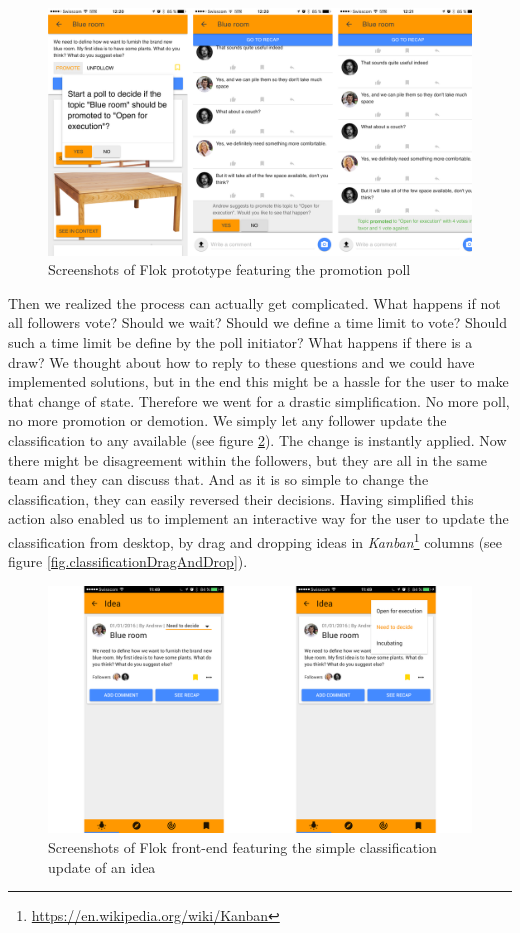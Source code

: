 \documentclass[a4paper,12pt, oneside]{article}
\begin{document}
\begin{figure}[!htb]
\centering
\includegraphics[width=\textwidth]{images/promotionPoll.png}
\caption{Screenshots of Flok prototype featuring the promotion poll}
\label{fig.promotionPoll}
\end{figure}

Then we realized the process can actually get complicated.
What happens if not all followers vote?
Should we wait?
Should we define a time limit to vote? Should such a time limit be define by the poll initiator?
What happens if there is a draw?
We thought about how to reply to these questions and we could have implemented solutions, but in the end this might be a hassle for the user to make that change of state.
Therefore we went for a drastic simplification.
No more poll, no more promotion or demotion.
We simply let any follower update the classification to any available (see figure \ref{fig.classificationSelect}).
The change is instantly applied.
Now there might be disagreement within the followers, but they are all in the same team and they can discuss that.
And as it is so simple to change the classification, they can easily reversed their decisions.
Having simplified this action also enabled us to implement an interactive way for the user to update the classification from desktop, by drag and dropping ideas in \emph{Kanban}\footnote{\url{https://en.wikipedia.org/wiki/Kanban}} columns (see figure \ref{fig.classificationDragAndDrop}).

\begin{figure}[!htb]
\centering
\includegraphics[width=\textwidth]{images/classificationSelect.png}
\caption{Screenshots of Flok front-end featuring the simple classification update of an idea}
\label{fig.classificationSelect}
\end{figure}
\end{document}
